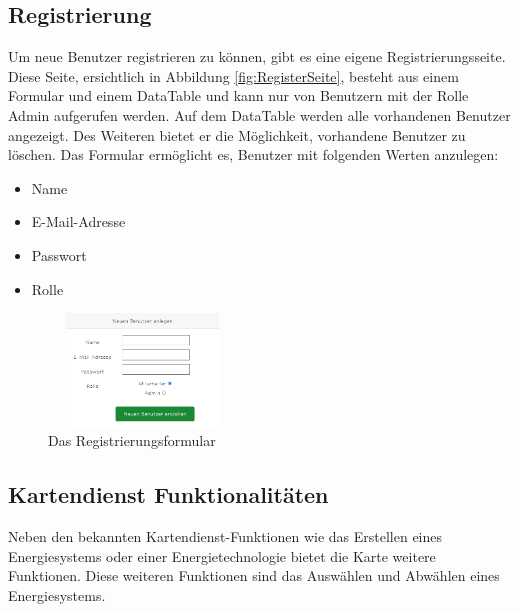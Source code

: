 \subsection{Registrierung}
Um neue Benutzer registrieren zu können, gibt es eine eigene Registrierungsseite. Diese Seite, ersichtlich in Abbildung \ref{fig:RegisterSeite}, besteht aus einem Formular und einem DataTable und kann nur von Benutzern mit der Rolle Admin aufgerufen werden. Auf dem DataTable werden alle vorhandenen Benutzer angezeigt. Des Weiteren bietet er die Möglichkeit, vorhandene Benutzer zu löschen. Das Formular ermöglicht es, Benutzer mit folgenden Werten anzulegen:
\begin{itemize}
	\item Name  
	\item E-Mail-Adresse
	\item Passwort  
	\item Rolle 
\end{itemize}
\begin{figure}[h]
	\centering
	\includegraphics[height=3cm,width=5cm]{images/RegisterFormular}
	\caption{Das Registrierungsformular}
	\label{fig:Register Formular}
\end{figure}



\subsection{Kartendienst Funktionalitäten}
Neben den bekannten Kartendienst-Funktionen wie das Erstellen eines Energiesystems oder einer Energietechnologie bietet die Karte weitere Funktionen. Diese weiteren Funktionen sind das Auswählen und Abwählen eines Energiesystems.

